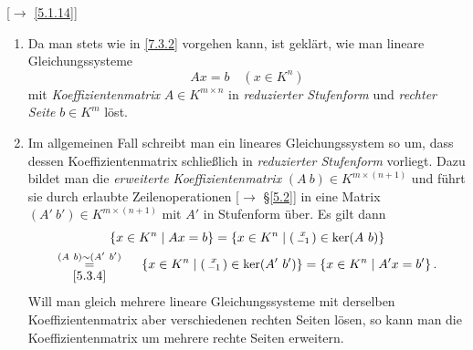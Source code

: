 \documentclass[../../main.tex]{subfiles}
\begin{document}
\begin{bem}\label{7.3.3}
[$\to$ \ref{5.1.14}] \begin{enumerate}[\normalfont(a)]
\item Da man stets wie in \ref{7.3.2} vorgehen kann, ist geklärt, wie man lineare Gleichungssysteme
\[Ax = b\quad(x\in K^n)\]
mit \emph{Koeffizientenmatrix} $A\in K^{m\times n}$ in \emph{reduzierter Stufenform} und \emph{rechter Seite} $b\in K^m$ löst.
\item Im allgemeinen Fall schreibt man ein lineares Gleichungssystem so um, dass dessen Koeffizientenmatrix schließlich in \emph{reduzierter Stufenform} vorliegt. Dazu bildet man die \emph{erweiterte Koeffizientenmatrix} $(A\ b)\in K^{m\times (n+1)}$ und führt sie durch erlaubte Zeilenoperationen [$\to$ §\ref{5.2}] in eine Matrix
$(A'\ b')\in K^{m\times(n+1)}$ mit $A'$ in Stufenform über. Es gilt dann 
\begin{multline*}
\left\{x\in K^n\mid Ax = b\right\}  = \left\{x\in K^n\mid\cvec{x\\-1}\in\ker(A\ b)\right\}\\
 \overset{(A\ b)\sim(A'\ b')}{\underset{\mathclap{\ref{5.3.4}}}{=}}~~~~ \left\{x\in K^n\mid\cvec{x\\-1}\in\ker(A'\ b')\right\}= \left\{x\in K^n\mid A'x = b'\right\}.
\end{multline*}
Will man gleich mehrere lineare Gleichungssysteme mit derselben Koeffizientenmatrix aber verschiedenen rechten Seiten lösen, so kann man die Koeffizientenmatrix um mehrere rechte Seiten erweitern.
\end{enumerate}
\end{bem}
\end{document}
